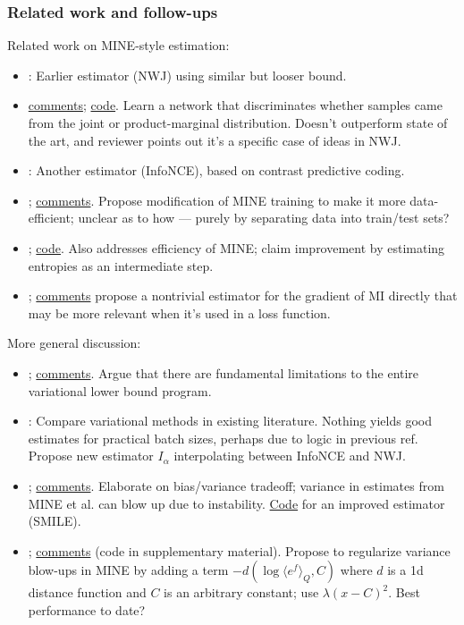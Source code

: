 \documentclass[notitlepage,openany,11pt]{report}
\numberwithin{equation}{section}
\theoremstyle{plain}%
\begin{document}
\subsubsection{Related work and follow-ups}

Related work on MINE-style estimation:
\begin{itemize}
\item \cite{NguyenEtAl:10}: Earlier estimator (NWJ) using similar but looser bound.
\item \cite{LiaoEtAl:20} \href{https://openreview.net/forum?id=3LujMJM9EMp}{comments}; \href{https://github.com/RayRuizhiLiao/demi_mi_estimator}{code}. Learn a network that discriminates whether samples came from the joint or product-marginal distribution. Doesn't outperform state of the art, and reviewer points out it's a specific case of ideas in NWJ.
\item \cite{OordEtAl:19}: Another estimator (InfoNCE), based on contrast predictive coding.
\item \cite{LinEtAl:19}; \href{https://openreview.net/forum?id=SklOypVKvS}{comments}. Propose modification of MINE training to make it more data-efficient; unclear as to how --- purely by separating data into train/test sets?
\item \cite{ChanEtAl:19}; \href{https://github.com/ccha23/MI-NEE}{code}. Also addresses efficiency of MINE; claim improvement by estimating entropies as an intermediate step.
\item \cite{WenEtAl:20}; \href{https://openreview.net/forum?id=ByxaUgrFvH}{comments} propose a nontrivial estimator for the gradient of MI directly that may be more relevant when it's used in a loss function.
\end{itemize}

More general discussion:
\begin{itemize}
\item \cite{McAllesterStratos:20}; \href{https://openreview.net/forum?id=BkedwoC5t7}{comments}. Argue that there are fundamental limitations to the entire variational lower bound program. 
\item \cite{PooleOzair:19}: Compare variational methods in existing literature. Nothing yields good estimates for practical batch sizes, perhaps due to logic in previous ref. Propose new estimator $I_{\alpha}$ interpolating between InfoNCE and NWJ.
\item \cite{SongErmon:20}; \href{https://openreview.net/forum?id=B1x62TNtDS}{comments}. Elaborate on bias/variance tradeoff; variance in estimates from MINE et al. can blow up due to instability. \href{https://github.com/ermongroup/smile-mi-estimator}{Code} for an improved estimator (SMILE).
\item \cite{ChoiLee:20}; \href{https://openreview.net/forum?id=Lvb2BKqL49a}{comments} (code in supplementary material). Propose to  regularize variance blow-ups in MINE by adding a term $- d( \log \langle e^f \rangle_{Q}, C)$ where $d$ is a 1d distance function and $C$ is an arbitrary constant; use $\lambda (x-C)^{2}$. Best performance to date?
\end{itemize}
\end{document}
